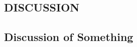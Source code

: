 \thispagestyle{empty}
\ResetSingleSpace

\begin{center}
\section{DISCUSSION}
\label{sec:Discussion}
\end{center}

\ResetDoubleSpace

\noindent
	\indent \lipsum[1-2]

\belowSubSecSkip

\subsection{Discussion of Something}
\label{sec:Discussion-of-results}
\noindent
	\indent \lipsum[1]
    



